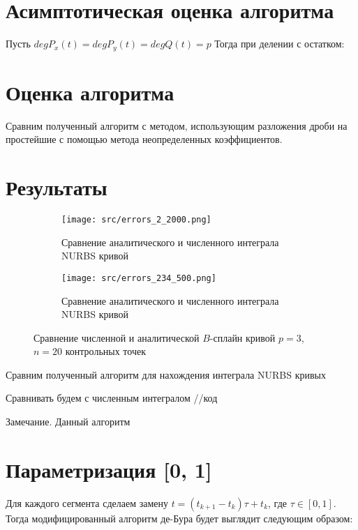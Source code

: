 \documentclass{article}
\begin{document}
\section{Асимптотическая оценка алгоритма}

Пусть $deg P_x(t) = deg P_y(t) = degQ(t) = p$
Тогда при делении с остатком:



\section{Оценка алгоритма}

Сравним полученный алгоритм с методом, использующим разложения дроби на простейшие с помощью метода неопределенных коэффициентов.




\section{Результаты}

\begin{figure}[H]
    \centering
    \begin{subfigure}[b]{0.49\textwidth}
        \centering
        \texttt{[image: src/errors\_2\_2000.png]}
        \caption{Сравнение аналитического и численного интеграла NURBS  кривой}\label{fig:plot3}
    \end{subfigure}
    \hfill
    \begin{subfigure}[b]{0.49\textwidth}
        \centering
        \texttt{[image: src/errors\_234\_500.png]}
        \caption{Сравнение аналитического и численного интеграла NURBS  кривой}\label{fig:errors3}
    \end{subfigure}
       \caption{Сравнение численной и аналитической $B$-сплайн кривой $p=3$, $n=20$ контрольных точек}
       \label{fig:compare_bspline_3}
\end{figure}

Сравним полученный алгоритм для нахождения интеграла NURBS кривых 

Сравнивать будем с численным интегралом
//код


Замечание. Данный алгоритм 
\pagebreak
\section{Параметризация [0, 1]}

Для каждого сегмента сделаем замену $t  = (t_{k+1}-t_{k}) \tau  + t_k$, где 
$ \tau \in [0, 1]$.
Тогда модифицированный алгоритм де-Бура будет выглядит следующим образом:
\end{document}
